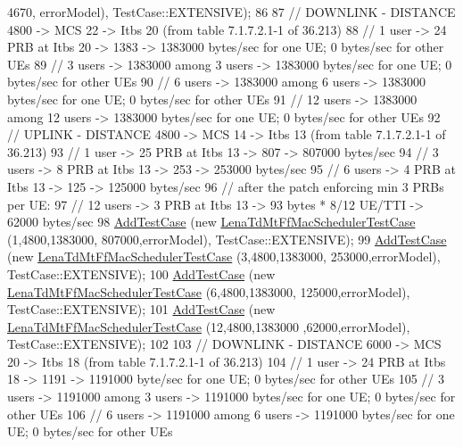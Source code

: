 \begin{DoxyCode}
      4670, errorModel), TestCase::EXTENSIVE);
86   
87   \textcolor{comment}{// DOWNLINK - DISTANCE 4800 -> MCS 22 -> Itbs 20 (from table 7.1.7.2.1-1 of 36.213)}
88   \textcolor{comment}{// 1 user -> 24 PRB at Itbs 20 -> 1383 -> 1383000 bytes/sec for one UE; 0 bytes/sec for other UEs}
89   \textcolor{comment}{// 3 users -> 1383000 among 3 users -> 1383000 bytes/sec for one UE; 0 bytes/sec for other UEs}
90   \textcolor{comment}{// 6 users -> 1383000 among 6 users -> 1383000 bytes/sec for one UE; 0 bytes/sec for other UEs}
91   \textcolor{comment}{// 12 users -> 1383000 among 12 users -> 1383000 bytes/sec for one UE; 0 bytes/sec for other UEs}
92   \textcolor{comment}{// UPLINK - DISTANCE 4800 -> MCS 14 -> Itbs 13 (from table 7.1.7.2.1-1 of 36.213)}
93   \textcolor{comment}{// 1 user -> 25 PRB at Itbs 13 -> 807 -> 807000 bytes/sec}
94   \textcolor{comment}{// 3 users -> 8 PRB at Itbs 13 -> 253 -> 253000 bytes/sec}
95   \textcolor{comment}{// 6 users -> 4 PRB at Itbs 13 -> 125 -> 125000 bytes/sec}
96   \textcolor{comment}{// after the patch enforcing min 3 PRBs per UE:}
97   \textcolor{comment}{// 12 users -> 3 PRB at Itbs 13 -> 93  bytes * 8/12 UE/TTI  -> 62000 bytes/sec}
98   \hyperlink{classns3_1_1TestCase_a3718088e3eefd5d6454569d2e0ddd835}{AddTestCase} (\textcolor{keyword}{new} \hyperlink{classLenaTdMtFfMacSchedulerTestCase}{LenaTdMtFfMacSchedulerTestCase} (1,4800,1383000,
      807000,errorModel), TestCase::EXTENSIVE);
99   \hyperlink{classns3_1_1TestCase_a3718088e3eefd5d6454569d2e0ddd835}{AddTestCase} (\textcolor{keyword}{new} \hyperlink{classLenaTdMtFfMacSchedulerTestCase}{LenaTdMtFfMacSchedulerTestCase} (3,4800,1383000,
      253000,errorModel), TestCase::EXTENSIVE);
100   \hyperlink{classns3_1_1TestCase_a3718088e3eefd5d6454569d2e0ddd835}{AddTestCase} (\textcolor{keyword}{new} \hyperlink{classLenaTdMtFfMacSchedulerTestCase}{LenaTdMtFfMacSchedulerTestCase} (6,4800,1383000,
      125000,errorModel), TestCase::EXTENSIVE);
101   \hyperlink{classns3_1_1TestCase_a3718088e3eefd5d6454569d2e0ddd835}{AddTestCase} (\textcolor{keyword}{new} \hyperlink{classLenaTdMtFfMacSchedulerTestCase}{LenaTdMtFfMacSchedulerTestCase} (12,4800,1383000
      ,62000,errorModel), TestCase::EXTENSIVE);
102 
103   \textcolor{comment}{// DOWNLINK - DISTANCE 6000 -> MCS 20 -> Itbs 18 (from table 7.1.7.2.1-1 of 36.213)}
104   \textcolor{comment}{// 1 user -> 24 PRB at Itbs 18 -> 1191 -> 1191000 byte/sec for one UE; 0 bytes/sec for other UEs}
105   \textcolor{comment}{// 3 users -> 1191000 among 3 users -> 1191000 bytes/sec for one UE; 0 bytes/sec for other UEs}
106   \textcolor{comment}{// 6 users -> 1191000 among 6 users -> 1191000 bytes/sec for one UE; 0 bytes/sec for other UEs}

\end{DoxyCode}
